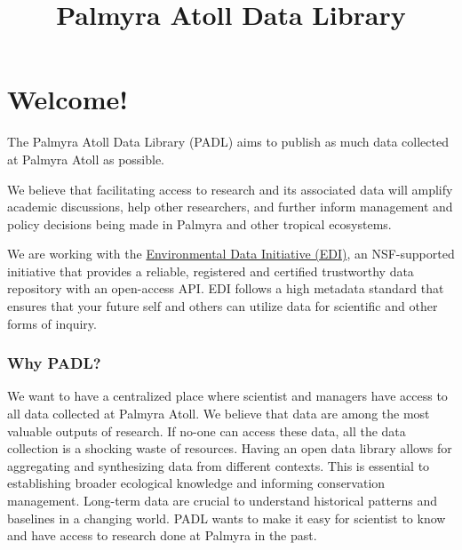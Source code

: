 \documentclass[
  letterpaper,
  DIV=11,
  numbers=noendperiod]{scrreprt}
\title{Palmyra Atoll Data Library}
\author{}
\date{}
\renewcommand*\contentsname{Table of contents}
\newcommand\contentsname{Table of contents}
\begin{document}
\maketitle
\ifdefined\Shaded\renewenvironment{Shaded}{\begin{tcolorbox}[breakable, sharp corners, interior hidden, boxrule=0pt, borderline west={3pt}{0pt}{shadecolor}, enhanced, frame hidden]}{\end{tcolorbox}}\fi

\renewcommand*\contentsname{Table of contents}
{
\hypersetup{linkcolor=}
\setcounter{tocdepth}{2}
\tableofcontents
}

\hypertarget{welcome}{%
\chapter*{Welcome!}\label{welcome}}

The Palmyra Atoll Data Library (PADL) aims to publish as much data
collected at Palmyra Atoll as possible.

We believe that facilitating access to research and its associated data
will amplify academic discussions, help other researchers, and further
inform management and policy decisions being made in Palmyra and other
tropical ecosystems.

We are working with the \href{https://edirepository.org/}{Environmental
Data Initiative (EDI)}, an NSF-supported initiative that provides a
reliable, registered and certified trustworthy data repository with an
open-access API. EDI follows a high metadata standard that ensures that
your future self and others can utilize data for scientific and other
forms of inquiry.

\hypertarget{why-padl}{%
\subsection*{Why PADL?}\label{why-padl}}

We want to have a centralized place where scientist and managers have
access to all data collected at Palmyra Atoll. We believe that data are
among the most valuable outputs of research. If no-one can access these
data, all the data collection is a shocking waste of resources. Having
an open data library allows for aggregating and synthesizing data from
different contexts. This is essential to establishing broader ecological
knowledge and informing conservation management. Long-term data are
crucial to understand historical patterns and baselines in a changing
world. PADL wants to make it easy for scientist to know and have access
to research done at Palmyra in the past.
\end{document}
